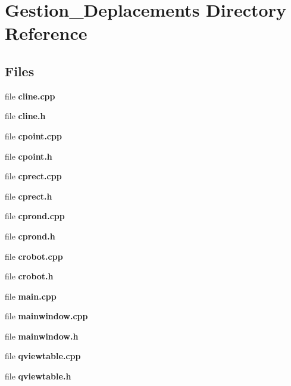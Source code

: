 \section{Gestion\-\_\-\-Deplacements Directory Reference}
\label{dir_df34e51f347211d49a72e3d6ff85b3cd}
\subsection*{Files}
\begin{DoxyCompactItemize}
\item 
file {\bfseries cline.\-cpp}
\item 
file {\bfseries cline.\-h}
\item 
file {\bfseries cpoint.\-cpp}
\item 
file {\bfseries cpoint.\-h}
\item 
file {\bfseries cprect.\-cpp}
\item 
file {\bfseries cprect.\-h}
\item 
file {\bfseries cprond.\-cpp}
\item 
file {\bfseries cprond.\-h}
\item 
file {\bfseries crobot.\-cpp}
\item 
file {\bfseries crobot.\-h}
\item 
file {\bfseries main.\-cpp}
\item 
file {\bfseries mainwindow.\-cpp}
\item 
file {\bfseries mainwindow.\-h}
\item 
file {\bfseries qviewtable.\-cpp}
\item 
file {\bfseries qviewtable.\-h}
\end{DoxyCompactItemize}
